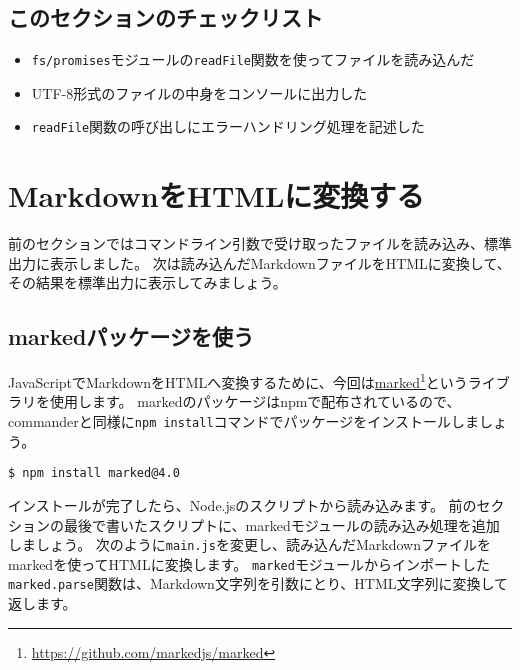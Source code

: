 \hypertarget{section-checklist}{%
\subsection{このセクションのチェックリスト}\label{section-checklist}}

\begin{itemize}
\item
  \texttt{fs/promises}モジュールの\texttt{readFile}関数を使ってファイルを読み込んだ
\item
  UTF-8形式のファイルの中身をコンソールに出力した
\item
  \texttt{readFile}関数の呼び出しにエラーハンドリング処理を記述した
\end{itemize}

\hypertarget{md-to-html}{%
\section{MarkdownをHTMLに変換する}\label{md-to-html}}

前のセクションではコマンドライン引数で受け取ったファイルを読み込み、標準出力に表示しました。
次は読み込んだMarkdownファイルをHTMLに変換して、その結果を標準出力に表示してみましょう。

\hypertarget{use-marked-package}{%
\subsection{markedパッケージを使う}\label{use-marked-package}}

JavaScriptでMarkdownをHTMLへ変換するために、今回は\href{https://github.com/markedjs/marked}{marked}\footnote{\url{https://github.com/markedjs/marked}}というライブラリを使用します。
markedのパッケージはnpmで配布されているので、commanderと同様に\texttt{npm install}コマンドでパッケージをインストールしましょう。

\begin{lstlisting}
$ npm install marked@4.0
\end{lstlisting}

インストールが完了したら、Node.jsのスクリプトから読み込みます。
前のセクションの最後で書いたスクリプトに、markedモジュールの読み込み処理を追加しましょう。
次のように\texttt{main.js}を変更し、読み込んだMarkdownファイルをmarkedを使ってHTMLに変換します。
\texttt{marked}モジュールからインポートした\texttt{marked.parse}関数は、Markdown文字列を引数にとり、HTML文字列に変換して返します。

